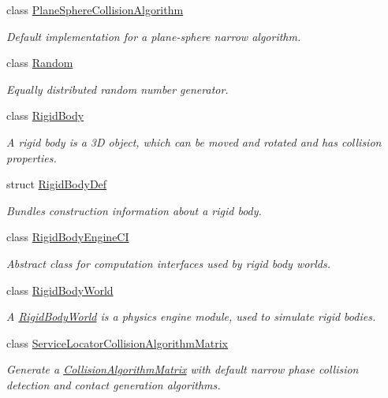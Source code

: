 \begin{DoxyCompactItemize}
class \mbox{\hyperlink{classr3_1_1_plane_sphere_collision_algorithm}{Plane\+Sphere\+Collision\+Algorithm}}
\begin{DoxyCompactList}\small\item\em Default implementation for a plane-\/sphere narrow algorithm. \end{DoxyCompactList}\item 
class \mbox{\hyperlink{classr3_1_1_random}{Random}}
\begin{DoxyCompactList}\small\item\em Equally distributed random number generator. \end{DoxyCompactList}\item 
class \mbox{\hyperlink{classr3_1_1_rigid_body}{Rigid\+Body}}
\begin{DoxyCompactList}\small\item\em A rigid body is a 3D object, which can be moved and rotated and has collision properties. \end{DoxyCompactList}\item 
struct \mbox{\hyperlink{structr3_1_1_rigid_body_def}{Rigid\+Body\+Def}}
\begin{DoxyCompactList}\small\item\em Bundles construction information about a rigid body. \end{DoxyCompactList}\item 
class \mbox{\hyperlink{classr3_1_1_rigid_body_engine_c_i}{Rigid\+Body\+Engine\+CI}}
\begin{DoxyCompactList}\small\item\em Abstract class for computation interfaces used by rigid body worlds. \end{DoxyCompactList}\item 
class \mbox{\hyperlink{classr3_1_1_rigid_body_world}{Rigid\+Body\+World}}
\begin{DoxyCompactList}\small\item\em A \mbox{\hyperlink{classr3_1_1_rigid_body_world}{Rigid\+Body\+World}} is a physics engine module, used to simulate rigid bodies. \end{DoxyCompactList}\item 
class \mbox{\hyperlink{classr3_1_1_service_locator_collision_algorithm_matrix}{Service\+Locator\+Collision\+Algorithm\+Matrix}}
\begin{DoxyCompactList}\small\item\em Generate a \mbox{\hyperlink{classr3_1_1_collision_algorithm_matrix}{Collision\+Algorithm\+Matrix}} with default narrow phase collision detection and contact generation algorithms. \end{DoxyCompactList}\item 

\end{DoxyCompactItemize}
